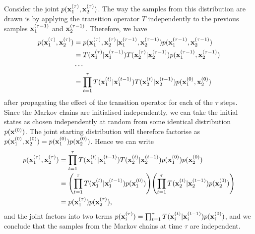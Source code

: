 \documentclass[a4paper]{article}
\theoremstyle{definition}
\begin{document}
Consider the joint $p(\mathbf{x}_1^{(\tau)}, \mathbf{x}_2^{(\tau)})$. The way the samples from this distribution are drawn is by applying the transition operator $T$ independently to the previous samples $\mathbf{x}_1^{(\tau-1)}$ and $\mathbf{x}_2^{(\tau-1)}$. Therefore, we have
\begin{align}
p(\mathbf{x}_1^{(\tau)}, \mathbf{x}_2^{(\tau)}) &= p(\mathbf{x}_1^{(\tau)}, \mathbf{x}_2^{(\tau)}|\mathbf{x}_1^{(\tau-1)}, \mathbf{x}_2^{(\tau-1)}) p(\mathbf{x}_1^{(\tau-1)}, \mathbf{x}_2^{(\tau-1)}) \\
&= T(\mathbf{x}_1^{(\tau)}|\mathbf{x}_1^{(\tau-1)})T( \mathbf{x}_2^{(\tau)}|\mathbf{x}_2^{(\tau-1)}) p(\mathbf{x}_1^{(\tau-1)}, \mathbf{x}_2^{(\tau-1)}) \\
& \cdots \\
&= \prod_{t=1}^{\tau} T(\mathbf{x}_1^{(t)}|\mathbf{x}_1^{(t-1)})T( \mathbf{x}_2^{(t)}|\mathbf{x}_2^{(t-1)}) p(\mathbf{x}_1^{(0)}, \mathbf{x}_2^{(0)})
\end{align}
after propagating the effect of the transition operator for each of the $\tau$ steps. Since the Markov chains are initialised independently, we can take the initial states as chosen independently at random from some identical distribution $p(\mathbf{x}^{(0)})$. The joint starting distribution will therefore factorise as $p(\mathbf{x}_1^{(0)}, \mathbf{x}_2^{(0)}) = p(\mathbf{x}_1^{(0)}) p(\mathbf{x}_2^{(0)}) $. Hence we can write
\begin{align}
p(\vx_1^{(\tau)}, \vx_2^{(\tau)}) &=  \prod_{t=1}^{\tau} T(\vx_1^{(t)}|\vx_1^{(t-1)})T( \vx_2^{(t)}|\vx_2^{(t-1)}) p(\vx_1^{(0)}) p(\vx_2^{(0)}) \\
 &=  \left(\prod_{t=1}^{\tau} T(\vx_1^{(t)}|\vx_1^{(t-1)})p(\vx_1^{(0)})\right)\left(\prod_{t=1}^{\tau} T(\vx_2^{(t)}|\vx_2^{(t-1)})p(\vx_2^{(0)})\right) \\
& = p(\vx_1^{(\tau)})p(\vx_2^{(\tau)}),
\end{align}
and the joint factors into two terms $p(\mathbf{x}_i^{(\tau)})=\prod_{t=1}^{\tau} T(\mathbf{x}_i^{(t)}|\mathbf{x}_i^{(t-1)}) p(\mathbf{x}_i^{(0)})$, and we conclude that the samples from the Markov chains at time $\tau$ are independent.
\end{document}
